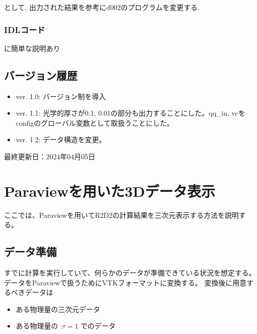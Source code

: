 \documentclass[letterpaper,10pt,dvipdfmx,report]{sphinxmanual}
\begin{document}
\begin{sphinxVerbatim}[commandchars=\\\{\}]
  
\end{sphinxVerbatim}

\sphinxAtStartPar
として, 出力された結果を参考にd002のプログラムを変更する.


\subsection{IDLコード}
\label{\detokenize{io:idl}}
\sphinxAtStartPar
{} に簡単な説明あり


\section{バージョン履歴}
\label{\detokenize{io:id8}}\begin{itemize}
\item {} 
\sphinxAtStartPar
ver. 1.0: バージョン制を導入

\item {} 
\sphinxAtStartPar
ver. 1.1: 光学的厚さが0.1, 0.01の部分も出力することにした。qq\_in, vcをconfigのグローバル変数として取扱うことにした。

\item {} 
\sphinxAtStartPar
ver. 1.2: データ構造を変更。

\end{itemize}

\sphinxAtStartPar
最終更新日：2024年04月05日

\sphinxstepscope


\chapter{Paraviewを用いた3Dデータ表示}
\label{\detokenize{paraview:paraview3d}}\label{\detokenize{paraview::doc}}
\sphinxAtStartPar
ここでは、Paraviewを用いてR2D2の計算結果を三次元表示する方法を説明する。


\section{データ準備}
\label{\detokenize{paraview:id1}}
\sphinxAtStartPar
すでに計算を実行していて、何らかのデータが準備できている状況を想定する。
データをParaviewで扱うためにVTKフォーマットに変換する。
変換後に用意するべきデータは
\begin{itemize}
\item {} 
\sphinxAtStartPar
ある物理量の三次元データ

\item {} 
\sphinxAtStartPar
ある物理量の :\(\tau=1\) でのデータ

\end{itemize}
\end{document}
